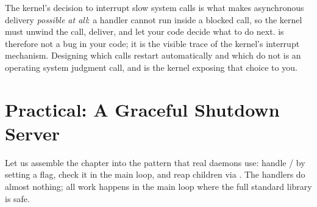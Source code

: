 \begin{osconcept}
The kernel's decision to interrupt slow system calls is what makes
asynchronous delivery \emph{possible at all}: a handler cannot run
inside a blocked call, so the kernel must unwind the call, deliver, and
let your code decide what to do next.  is therefore not a
bug in your code; it is the visible trace of the kernel's interrupt
mechanism. Designing which calls restart automatically and which do
not is an operating system judgment call, and  is the
kernel exposing that choice to you.
\end{osconcept}

\section{Practical: A Graceful Shutdown Server}

Let us assemble the chapter into the pattern that real daemons use:
handle / by setting a flag, check it in the
main loop, and reap children via . The handlers do almost
nothing; all work happens in the main loop where the full standard
library is safe.

